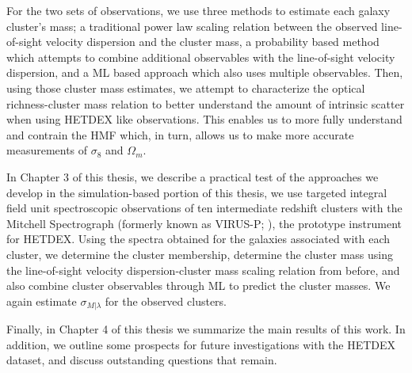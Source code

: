For the two sets of observations, we use three methods to estimate each galaxy cluster's mass; a traditional power law scaling relation between the observed line-of-sight velocity dispersion and the cluster mass, a probability based method which attempts to combine additional observables with the line-of-sight velocity dispersion, and a ML based approach which also uses multiple observables. Then, using those cluster mass estimates, we attempt to characterize the optical richness-cluster mass relation to better understand the amount of intrinsic scatter when using HETDEX like observations. This enables us to more fully understand and contrain the HMF which, in turn, allows us to make more accurate measurements of $\sigma_8$ and $\Omega_m$.

In Chapter 3 of this thesis, we describe a practical test of the approaches we develop in the simulation-based portion of this thesis, we use targeted integral field unit spectroscopic observations of ten intermediate redshift clusters with the Mitchell Spectrograph (formerly known as VIRUS-P; \citealt{Hill2008a}), the prototype instrument for HETDEX. Using the spectra obtained for the galaxies associated with each cluster, we determine the cluster membership, determine the cluster mass using the line-of-sight velocity dispersion-cluster mass scaling relation from before, and also combine cluster observables through ML to predict the cluster masses. We again estimate $\sigma_{M|\lambda}$ for the observed clusters.

Finally, in Chapter 4 of this thesis we summarize the main results of this work. In addition, we outline some prospects for future investigations with the HETDEX dataset, and discuss outstanding questions that remain. 
